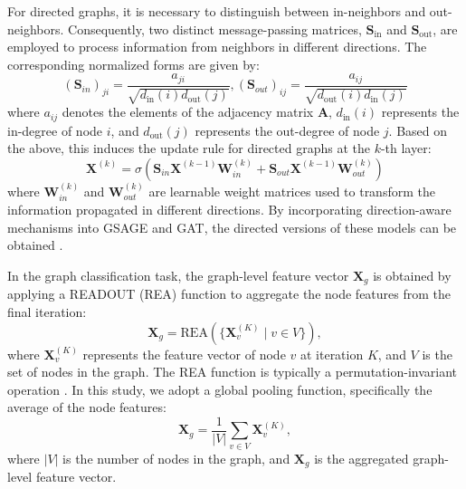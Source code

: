 \documentclass[lettersize,journal]{IEEEtran}
\begin{document}
For directed graphs, it is necessary to distinguish between in-neighbors and out-neighbors. Consequently, two distinct message-passing matrices, \( \mathbf{S}_{\text{in}} \) and \( \mathbf{S}_{\text{out}} \), are employed to process information from neighbors in different directions. The corresponding normalized forms are given by:
\begin{equation}
(\mathbf{S}_{in})_{ji} = \frac{a_{ji}}{\sqrt{d_{\text{in}}(i) d_{\text{out}}(j)}},
(\mathbf{S}_{out})_{ij} = \frac{a_{ij}}{\sqrt{d_{\text{out}}(i) d_{\text{in}}(j)}}
\end{equation}
where \( a_{ij} \) denotes the elements of the adjacency matrix \( \mathbf{A} \), \( d_{\text{in}}(i) \) represents the in-degree of node \( i \), and \( d_{\text{out}}(j) \) represents the out-degree of node \( j \). Based on the above, this induces the update rule for directed graphs at the \( k \)-th layer:
\begin{equation}
\mathbf{X}^{(k)} = \sigma \left( \mathbf{S}_{in} \mathbf{X}^{(k-1)} \mathbf{W}_{in}^{(k)} + \mathbf{S}_{out} \mathbf{X}^{(k-1)} \mathbf{W}_{out}^{(k)} \right)
\end{equation}
where \( \mathbf{W}_{in}^{(k)} \) and \( \mathbf{W}_{out}^{(k)} \) are learnable weight matrices used to transform the information propagated in different directions. By incorporating direction-aware mechanisms into GSAGE and GAT, the directed versions of these models can be obtained \cite{rossi2024edge}.

In the graph classification task, the graph-level feature vector \( \mathbf{X}_g \) is obtained by applying a READOUT (REA) function to aggregate the node features from the final iteration:
\begin{equation}
\mathbf{X}_g = \text{REA}(\{\mathbf{X}_v^{(K)} \mid v \in V\}),
\end{equation}
where \( \mathbf{X}_v^{(K)} \) represents the feature vector of node \( v \) at iteration \( K \), and \( V \) is the set of nodes in the graph. The REA function is typically a permutation-invariant operation  \cite{xu2018powerful}. In this study, we adopt a global pooling function, specifically the average of the node features:
\begin{equation}
\mathbf{X}_g = \frac{1}{|V|} \sum_{v \in V} \mathbf{X}_v^{(K)},
\end{equation}
where \( |V| \) is the number of nodes in the graph, and \( \mathbf{X}_g \) is the aggregated graph-level feature vector.
\end{document}
